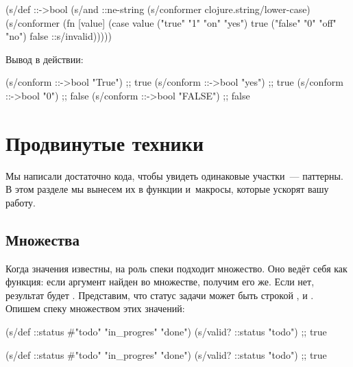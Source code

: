 \else

\begin{clojure}
(s/def ::->bool
  (s/and
   ::ne-string
   (s/conformer clojure.string/lower-case)
   (s/conformer
    (fn [value]
      (case value
        ("true" "1" "on" "yes") true
        ("false" "0" "off" "no") false
        ::s/invalid)))))

\end{clojure}

\fi

\noindent
Вывод в действии:

\begin{clojure}
(s/conform ::->bool "True")  ;; true
(s/conform ::->bool "yes")   ;; true
(s/conform ::->bool "0")     ;; false
(s/conform ::->bool "FALSE") ;; false
\end{clojure}

\section{Продвинутые техники}


Мы написали достаточно кода, чтобы увидеть одинаковые участки~--- паттерны. В
этом разделе мы вынесем их в функции и~макросы, которые ускорят вашу работу.

\subsection{Множества}


Когда значения известны, на роль спеки подходит множество. Оно ведёт себя как
функция: если аргумент найден во множестве, получим его же. Если нет, результат
будет . Представим, что статус задачи может быть строкой ,
 и . Опишем спеку множеством этих значений:

\ifnarrow

\begin{clojure}
(s/def ::status
  #{"todo" "in_progres" "done"})
(s/valid? ::status "todo") ;; true
\end{clojure}

\else

\begin{clojure}
(s/def ::status #{"todo" "in_progres" "done"})
(s/valid? ::status "todo") ;; true
\end{clojure}

\fi

